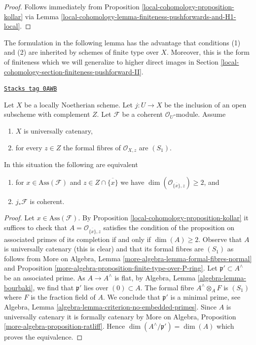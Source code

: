 \begin{proof}
Follows immediately from Proposition \ref{local-cohomology-proposition-kollar}
via Lemma \ref{local-cohomology-lemma-finiteness-pushforwards-and-H1-local}.
\end{proof}

The formulation in the following lemma has the advantage that conditions
(1) and (2) are inherited by schemes of finite type over $X$.
Moreover, this is the form of finiteness which we will generalize
to higher direct images in Section \ref{local-cohomology-section-finiteness-pushforward-II}.

\begin{lemma}
\label{local-cohomology-lemma-finiteness-pushforward-general}
\href{https://stacks.math.columbia.edu/tag/0AWB}{\texttt{Stacks tag 0AWB}}

Let $X$ be a locally Noetherian scheme.
Let $j : U \to X$ be the inclusion of an
open subscheme with complement $Z$. Let $\mathcal{F}$ be a coherent
$\mathcal{O}_U$-module. Assume
\begin{enumerate}
\item $X$ is universally catenary,
\item for every $z \in Z$ the formal fibres of $\mathcal{O}_{X, z}$
are $(S_1)$.
\end{enumerate}
In this situation the following are equivalent
\begin{enumerate}
\item[(a)] for $x \in \text{Ass}(\mathcal{F})$ and
$z \in Z \cap \overline{\{x\}}$ we have
$\dim(\mathcal{O}_{\overline{\{x\}}, z}) \geq 2$, and
\item[(b)] $j_*\mathcal{F}$ is coherent.
\end{enumerate}
\end{lemma}

\begin{proof}
Let $x \in \text{Ass}(\mathcal{F})$. By Proposition \ref{local-cohomology-proposition-kollar}
it suffices to check that $A = \mathcal{O}_{\overline{\{x\}}, z}$ satisfies
the condition of the proposition on associated primes of its completion
if and only if $\dim(A) \geq 2$.
Observe that $A$ is universally catenary (this is clear)
and that its formal fibres are $(S_1)$ as follows from
More on Algebra, Lemma \ref{more-algebra-lemma-formal-fibres-normal} and
Proposition \ref{more-algebra-proposition-finite-type-over-P-ring}.
Let $\mathfrak p' \subset A^\wedge$ be an associated prime.
As $A \to A^\wedge$ is flat,
by Algebra, Lemma \ref{algebra-lemma-bourbaki},
we find that $\mathfrak p'$ lies over $(0) \subset A$.
The formal fibre $A^\wedge \otimes_A F$ is $(S_1)$ where $F$ is
the fraction field of $A$. We conclude that $\mathfrak p'$ is a
minimal prime, see
Algebra, Lemma \ref{algebra-lemma-criterion-no-embedded-primes}.
Since $A$ is universally catenary it is formally catenary
by More on Algebra, Proposition \ref{more-algebra-proposition-ratliff}.
Hence $\dim(A^\wedge/\mathfrak p') = \dim(A)$ which
proves the equivalence.
\end{proof}

